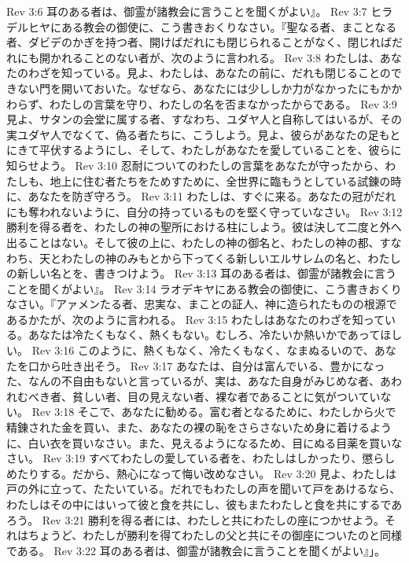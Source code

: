 Rev 3:6  耳のある者は、御霊が諸教会に言うことを聞くがよい』。
Rev 3:7  ヒラデルヒヤにある教会の御使に、こう書きおくりなさい。『聖なる者、まことなる者、ダビデのかぎを持つ者、開けばだれにも閉じられることがなく、閉じればだれにも開かれることのない者が、次のように言われる。
Rev 3:8  わたしは、あなたのわざを知っている。見よ、わたしは、あなたの前に、だれも閉じることのできない門を開いておいた。なぜなら、あなたには少ししか力がなかったにもかかわらず、わたしの言葉を守り、わたしの名を否まなかったからである。
Rev 3:9  見よ、サタンの会堂に属する者、すなわち、ユダヤ人と自称してはいるが、その実ユダヤ人でなくて、偽る者たちに、こうしよう。見よ、彼らがあなたの足もとにきて平伏するようにし、そして、わたしがあなたを愛していることを、彼らに知らせよう。
Rev 3:10  忍耐についてのわたしの言葉をあなたが守ったから、わたしも、地上に住む者たちをためすために、全世界に臨もうとしている試錬の時に、あなたを防ぎ守ろう。
Rev 3:11  わたしは、すぐに来る。あなたの冠がだれにも奪われないように、自分の持っているものを堅く守っていなさい。
Rev 3:12  勝利を得る者を、わたしの神の聖所における柱にしよう。彼は決して二度と外へ出ることはない。そして彼の上に、わたしの神の御名と、わたしの神の都、すなわち、天とわたしの神のみもとから下ってくる新しいエルサレムの名と、わたしの新しい名とを、書きつけよう。
Rev 3:13  耳のある者は、御霊が諸教会に言うことを聞くがよい』。
Rev 3:14  ラオデキヤにある教会の御使に、こう書きおくりなさい。『アァメンたる者、忠実な、まことの証人、神に造られたものの根源であるかたが、次のように言われる。
Rev 3:15  わたしはあなたのわざを知っている。あなたは冷たくもなく、熱くもない。むしろ、冷たいか熱いかであってほしい。
Rev 3:16  このように、熱くもなく、冷たくもなく、なまぬるいので、あなたを口から吐き出そう。
Rev 3:17  あなたは、自分は富んでいる、豊かになった、なんの不自由もないと言っているが、実は、あなた自身がみじめな者、あわれむべき者、貧しい者、目の見えない者、裸な者であることに気がついていない。
Rev 3:18  そこで、あなたに勧める。富む者となるために、わたしから火で精錬された金を買い、また、あなたの裸の恥をさらさないため身に着けるように、白い衣を買いなさい。また、見えるようになるため、目にぬる目薬を買いなさい。
Rev 3:19  すべてわたしの愛している者を、わたしはしかったり、懲らしめたりする。だから、熱心になって悔い改めなさい。
Rev 3:20  見よ、わたしは戸の外に立って、たたいている。だれでもわたしの声を聞いて戸をあけるなら、わたしはその中にはいって彼と食を共にし、彼もまたわたしと食を共にするであろう。
Rev 3:21  勝利を得る者には、わたしと共にわたしの座につかせよう。それはちょうど、わたしが勝利を得てわたしの父と共にその御座についたのと同様である。
Rev 3:22  耳のある者は、御霊が諸教会に言うことを聞くがよい』」。
